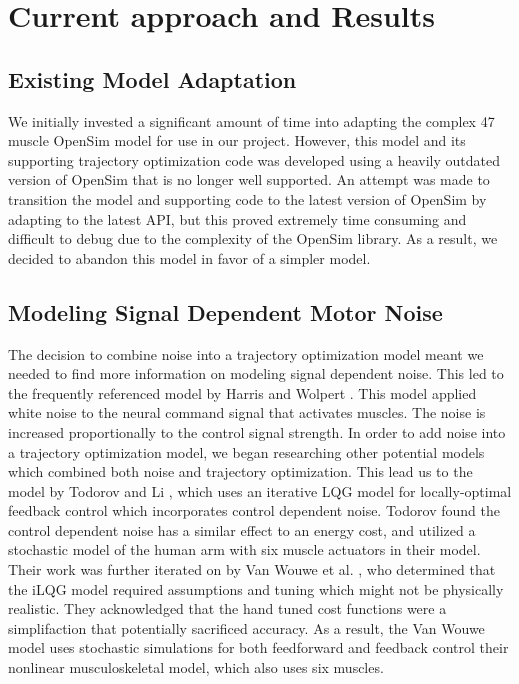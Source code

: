 \documentclass[table,12pt]{article}
\begin{document}
\section{Current approach and Results}

\subsection{Existing Model Adaptation}
We initially invested a significant amount of time into adapting the complex 47 muscle OpenSim model for use in our project. However, this model and its supporting trajectory optimization code was developed using a heavily outdated version of OpenSim that is no longer well supported. An attempt was made to transition the model and supporting code to the latest version of OpenSim by adapting to the latest API, but this proved extremely time consuming and difficult to debug due to the complexity of the OpenSim library. As a result, we decided to abandon this model in favor of a simpler model.

\subsection{Modeling Signal Dependent Motor Noise}
The decision to combine noise into a trajectory optimization model meant we needed to find more information on modeling signal dependent noise. This led to the frequently referenced model by Harris and Wolpert \cite{c2}. This model applied white noise to the neural command signal that activates muscles. The noise is increased proportionally to the control signal strength. In order to add noise into a trajectory optimization model, we began researching other potential models which combined both noise and trajectory optimization. This lead us to the model by Todorov and Li \cite{c8}, which uses an iterative LQG model for locally-optimal feedback control which incorporates control dependent noise. Todorov found the control dependent noise has a similar effect to an energy cost, and utilized a stochastic model of the human arm with six muscle actuators in their model. Their work was further iterated on by Van Wouwe et al. \cite{c7}, who determined that the iLQG model required assumptions and tuning which might not be physically realistic. They acknowledged that the hand tuned cost functions were a simplifaction that potentially sacrificed accuracy. As a result, the Van Wouwe model uses stochastic simulations for both feedforward and feedback control their nonlinear musculoskeletal model, which also uses six muscles. 
\end{document}
